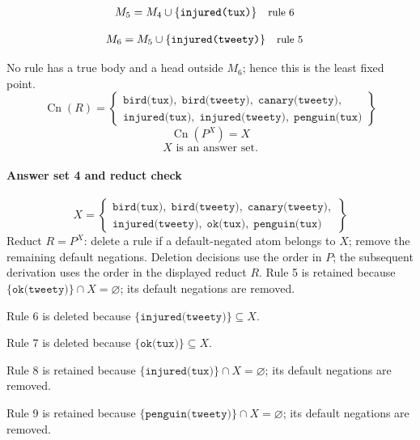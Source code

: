 \documentclass[a4paper,11pt]{article}
\newif\ifexplain
\newcommand{\explain}[1]{\ifexplain\begin{erklbox}#1\end{erklbox}\fi}
\newcommand{\why}[1]{\text{\small #1}}
\newcommand{\at}[1]{\texttt{#1}}
\begin{document}
\begin{align*}
M_{5} &= M_{4}\cup \{\at{injured(tux)}\} && \why{rule 6}
\end{align*}
\explain{Für $\at{injured(tux)}$ brauchen wir $\at{bird(tux)}$. Weil diese Voraussetzungen bereits hergeleitet sind, dürfen wir den Regelkopf jetzt aufnehmen und alle bisherigen Atome behalten; bei einer fehlenden Voraussetzung würde diese Regel dagegen noch nichts beitragen.}
\begin{align*}
M_{6} &= M_{5}\cup \{\at{injured(tweety)}\} && \why{rule 5}
\end{align*}
\explain{Für $\at{injured(tweety)}$ brauchen wir $\at{bird(tweety)}$. Weil diese Voraussetzungen bereits hergeleitet sind, dürfen wir den Regelkopf jetzt aufnehmen und alle bisherigen Atome behalten; bei einer fehlenden Voraussetzung würde diese Regel dagegen noch nichts beitragen.}
No rule has a true body and a head outside $M_{6}$; hence this is the least fixed point.
\[
\operatorname{Cn}(R)=\left\{\begin{gathered}\at{bird(tux)},\;\at{bird(tweety)},\;\at{canary(tweety)},\\\at{injured(tux)},\;\at{injured(tweety)},\;\at{penguin(tux)}\end{gathered}\right\}
\]
\[
\operatorname{Cn}(P^X)=X
\]
\[
\boxed{X\text{ is an answer set.}}
\]
\paragraph{Answer set 4 and reduct check}
\[
X=\left\{\begin{gathered}\at{bird(tux)},\;\at{bird(tweety)},\;\at{canary(tweety)},\\\at{injured(tweety)},\;\at{ok(tux)},\;\at{penguin(tux)}\end{gathered}\right\}
\]
Reduct $R=P^X$: delete a rule if a default-negated atom belongs to $X$; remove the remaining default negations. Deletion decisions use the order in $P$; the subsequent derivation uses the order in the displayed reduct $R$.
Rule 5 is retained because $\{\at{ok(tweety)}\}\cap X=\varnothing$; its default negations are removed.

Rule 6 is deleted because $\{\at{injured(tweety)}\}\subseteq X$.

Rule 7 is deleted because $\{\at{ok(tux)}\}\subseteq X$.

Rule 8 is retained because $\{\at{injured(tux)}\}\cap X=\varnothing$; its default negations are removed.

Rule 9 is retained because $\{\at{penguin(tweety)}\}\cap X=\varnothing$; its default negations are removed.
\end{document}
